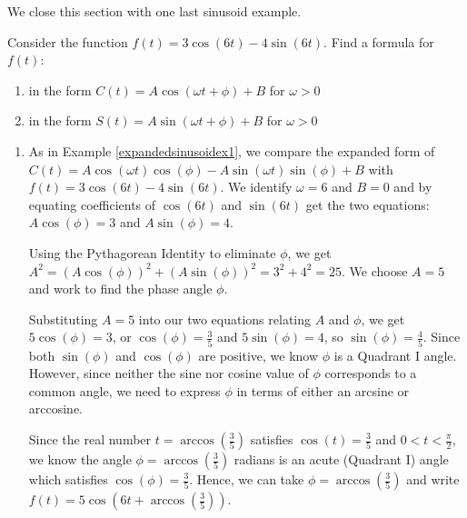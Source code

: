\documentclass{ximera}
\begin{document}
 

We close this section with one last sinusoid example.

\begin{example}  \label{expandedsinusoidinverseex}  Consider the function $f(t) = 3\cos(6t) -4 \sin(6t)$. Find a formula for $f(t)$:

\begin{enumerate}

\item  in the form $C(t) = A \cos(\omega t + \phi) + B$ for $\omega > 0$

\item  in the form $S(t) = A \sin(\omega t + \phi) + B$ for $\omega > 0$

\end{enumerate}

\begin{explanation} 

\begin{enumerate}

\item As in Example \ref{expandedsinusoidex1}, we compare the expanded form of $C(t) = A \cos(\omega t) \cos(\phi) - A \sin(\omega t) \sin(\phi) + B$ with $f(t) = 3\cos(6t) -4 \sin(6t)$. We identify $\omega = 6$ and $B = 0$ and by equating coefficients of  $\cos(6t)$ and $\sin(6t)$  get the two equations: $A \cos(\phi) = 3$ and $A \sin(\phi) = 4$.

 

Using the Pythagorean Identity to eliminate $\phi$, we get $A^2 = (A \cos(\phi))^2 + (A \sin(\phi))^2 = 3^2 + 4^2 = 25$.  We choose $A = 5$ and work to find the phase angle $\phi$.

 

Substituting $A = 5$ into our two equations relating $A$ and $\phi$, we get $5 \cos(\phi) = 3$, or $\cos(\phi) = \frac{3}{5}$  and $5 \sin(\phi) = 4$, so $\sin(\phi) = \frac{4}{5}$.  Since both $\sin(\phi)$ and $\cos(\phi)$ are positive, we know $\phi$ is a Quadrant I angle.  However, since neither the sine nor cosine value of $\phi$ corresponds to a common angle, we need to express $\phi$ in terms of either an arcsine or arccosine.

 

Since the real number $t = \arccos\left(\frac{3}{5}\right)$ satisfies $\cos(t) = \frac{3}{5}$ and $0 < t < \frac{\pi}{2}$, we know the angle $\phi = \arccos\left(\frac{3}{5}\right)$ radians is an acute (Quadrant I) angle which satisfies $\cos(\phi) = \frac{3}{5}$.  Hence, we can take $\phi = \arccos\left(\frac{3}{5}\right)$ and write $f(t) = 5 \cos\left(6t + \arccos\left(\frac{3}{5}\right) \right)$.


\end{enumerate}
\end{explanation}
\end{example}
\end{document}
